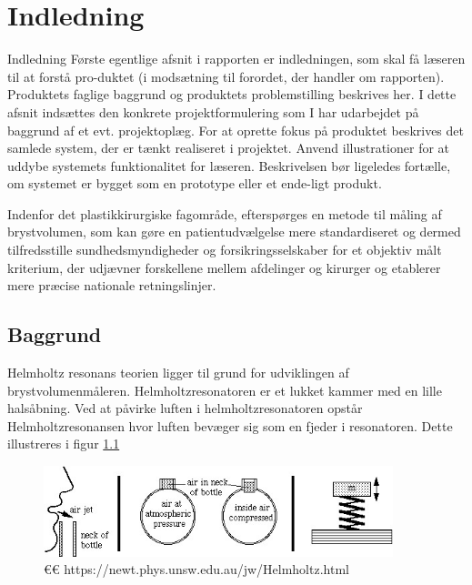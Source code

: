 \chapter{Indledning}

Indledning
Første egentlige afsnit i rapporten er indledningen, som skal få læseren til at forstå pro-duktet (i modsætning til forordet, der handler om rapporten). Produktets faglige baggrund og produktets problemstilling beskrives her.
I dette afsnit indsættes den konkrete projektformulering som I har udarbejdet på baggrund af et evt. projektoplæg.
For at oprette fokus på produktet beskrives det samlede system, der er tænkt realiseret i projektet. Anvend illustrationer for at uddybe systemets funktionalitet for læseren.
Beskrivelsen bør ligeledes fortælle, om systemet er bygget som en prototype eller et ende-ligt produkt.

 

Indenfor det plastikkirurgiske fagområde, efterspørges en metode til måling af brystvolumen, som kan gøre en patientudvælgelse mere standardiseret og dermed tilfredsstille sundhedsmyndigheder og forsikringsselskaber for et objektiv målt kriterium, der udjævner forskellene mellem afdelinger og kirurger og etablerer mere præcise nationale retningslinjer. 


\section{Baggrund}



Helmholtz resonans teorien ligger til grund for udviklingen af brystvolumenmåleren. Helmholtzresonatoren er et lukket kammer med en lille halsåbning. Ved at påvirke luften i helmholtzresonatoren opstår Helmholtzresonansen hvor luften bevæger sig som en fjeder i resonatoren. Dette illustreres i  figur \ref{fig:Helmholtzteori}

\begin{figure}[htb]
\centering
\includegraphics[width=4in]{Helmholtzresonans}
\caption{€€ https://newt.phys.unsw.edu.au/jw/Helmholtz.html}
\label{fig:Helmholtzteori}
\end{figure}


